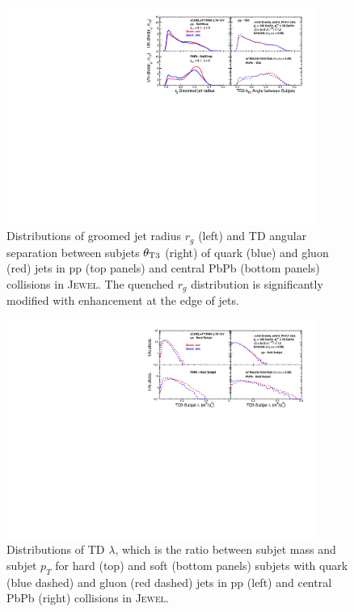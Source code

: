 \documentclass[notoc,preprintnumbers]{JHEP3}
\begin{document}
\begin{figure}[t]
	   \centering
	   \includegraphics[width=0.9\textwidth]{plots/Comp_rg_new.pdf}
	   \caption{Distributions of groomed jet radius $r_g$ (left) and TD angular separation between subjets $\theta_{\rm T3}$ (right) of quark (blue) and gluon (red) jets in pp (top panels) and central PbPb (bottom panels) collisions in \textsc{Jewel}. The quenched $r_{g}$ distribution is significantly modified with enhancement at the edge of jets.}
\label{fig:comp_rg}
\end{figure}

\begin{figure}[t]
	   \centering
	   \includegraphics[width=0.9\textwidth]{plots/Comp_lambda_new.pdf}
	   \caption{Distributions of TD $\lambda$, which is the ratio between subjet mass and subjet $p_T$ for hard (top) and soft (bottom panels) subjets with quark (blue dashed) and gluon (red dashed) jets in pp (left) and central PbPb (right) collisions in \textsc{Jewel}. }
\label{fig:comp_subjet_m}
\end{figure}
\end{document}
